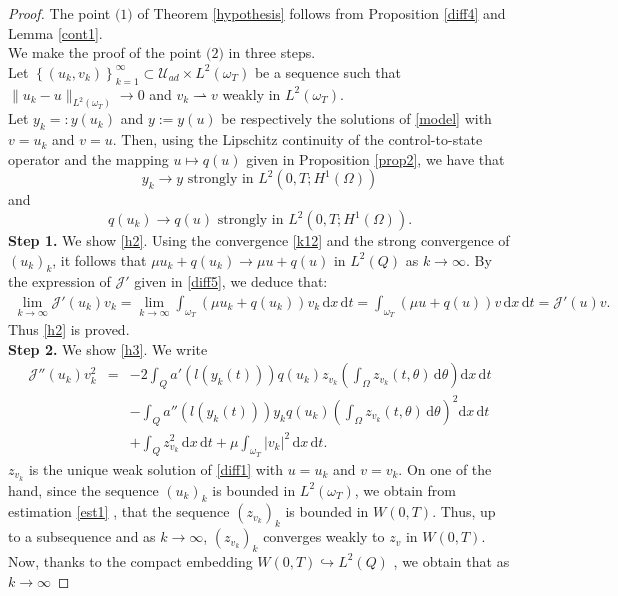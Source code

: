 \documentclass[reqno,twoside]{amsart}
\numberwithin{equation}{section}
\theoremstyle{definition}
\numberwithin{equation}{section}
\def \dis {\displaystyle}
\def \U {{\mathcal U}}
\def \dq {\mathrm{d}x \, \mathrm{d}t}
\def \d {\mathrm{d}}
\def \U {\mathcal{U}}
\begin{document}
\begin{proof}
The point $\textit{(1)}$ of Theorem \ref{hypothesis} follows from Proposition \ref{diff4} and Lemma \ref{cont1}.\\
We make the proof of the point $\textit{(2)}$ in three steps.\\
Let $\left\{(u_k,v_k)\right\}_{k=1}^{\infty}\subset \U_{ad}\times L^2(\omega_T)$ be a sequence such that $\|u_k-u\|_{L^2(\omega_T)}\to 0$ and $v_k \rightharpoonup v$ weakly in $L^2(\omega_T)$.\\
Let $y_k=:y(u_k)$ and $y:=y(u)$ be respectively the solutions of \eqref{model} with $v=u_k$ and $v=u$.
Then, using the Lipschitz continuity of the control-to-state operator and  the mapping $u\mapsto q(u)$ given in Proposition \ref{prop2}, we have that
\begin{equation}\label{k11}
	y_k\to y   \text{ strongly in }  L^2(0,T;H^1(\Omega))
\end{equation}
and
\begin{equation}\label{k12}
	q(u_k)\to q(u)   \text{ strongly in }  L^2(0,T;H^1(\Omega)).
\end{equation}
\noindent \textbf{Step 1.} We show \eqref{h2}.  Using the convergence \eqref{k12} and the strong convergence of $(u_k)_k$, it follows that  $\mu u_k+ q(u_k)\to \mu u+q(u)$ in $L^2(Q)$ as $k\to \infty$. By the expression of $\mathcal{ J}'$ given in \eqref{diff5}, we deduce that:
\begin{eqnarray*}
	\dis \lim_{k\to \infty} \mathcal{J}'(u_k)v_k=\lim_{k\to \infty}\int_{\omega_T}(\mu u_k+q(u_k))v_k\, \dq =\int_{\omega_T}(\mu u+q(u))v\, \dq= \mathcal{J}'(u)v.
\end{eqnarray*}
Thus \eqref{h2} is proved.\\
\noindent \textbf{Step 2.} We show \eqref{h3}. We write
\begin{equation}\label{d}
	\begin{array}{lllll}
		\dis 	\mathcal{J}''(u_k)v_k^2&=&\dis -2\int_{Q}a'(l(y_k(t)))q(u_k)z_{v_k}\left(\int_{\Omega}z_{v_k}(t,\theta)\,\d \theta\right)\dq\\
		&&\dis -\int_{Q}a''(l(y_k(t)))y_kq(u_k)\left(\int_{\Omega}z_{v_k}(t,\theta)\,\d \theta\right)^2\dq\\
		&&\dis +\int_{Q}z^2_{v_k}\, \dq+\mu\int_{\omega_T}|v_k|^2\, \dq.
	\end{array}
\end{equation}
$z_{v_k}$ is the unique weak solution of \eqref{diff1} with $u=u_k$ and $v=v_k$. On one of the hand, since the sequence $(u_k)_k$ is bounded in $L^2(\omega_T)$, we obtain from estimation \eqref{est1} , that the sequence $(z_{v_k})_k$ is  bounded in $W(0,T)$. Thus, up to a subsequence and as $k\to \infty$,  $(z_{v_k})_k$ converges weakly to $z_{v}$ in $W(0,T)$. Now, thanks to the compact embedding $W(0,T)\hookrightarrow L^2(Q)$ , we obtain that as $k\to \infty$

\end{proof}
\end{document}
